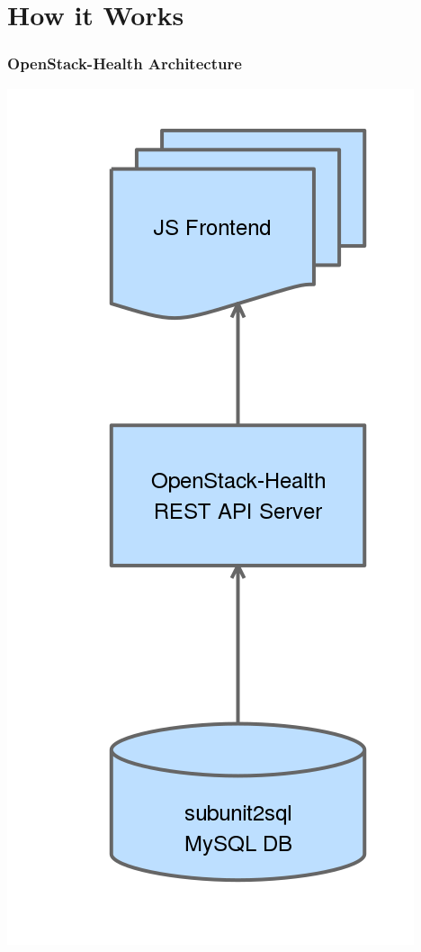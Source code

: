 \documentclass[aspectratio=169,11pt,hyperref={colorlinks=true}]{beamer}
\begin{document}
\section{How it Works}
\begin{frame}
    \frametitle{OpenStack-Health Architecture}
    \begin{center}
        \includegraphics[height=.8\textheight]{openstack-health-arch.png}
    \end{center}
\end{frame}
\end{document}
